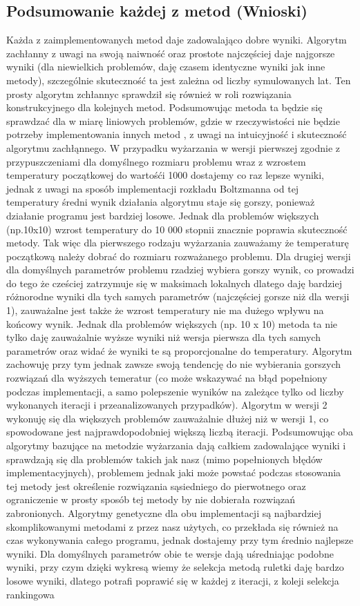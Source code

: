 \documentclass{article}
\begin{document}
\subsection{Podsumowanie każdej z metod (Wnioski)}
Każda z zaimplementowanych metod daje zadowalająco dobre wyniki. Algorytm zachłanny z uwagi na swoją naiwność oraz prostote najczęściej daje najgorsze wyniki (dla niewielkich problemów, daję czasem identyczne wyniki jak inne metody), szczególnie skuteczność ta jest zależna od liczby symulowanych lat. Ten prosty algorytm zchłannyc sprawdził się również w roli rozwiązania konstrukcyjnego dla kolejnych metod. Podsumowując metoda ta będzie się sprawdzać dla w miarę liniowych problemów, gdzie w rzeczywistości nie będzie potrzeby implementowania innych metod , z uwagi na intuicyjność i skuteczność algorytmu zachłąnnego. W przypadku wyżarzania w wersji pierwszej zgodnie z przypuszczeniami dla domyślnego rozmiaru problemu wraz z wzrostem temperatury początkowej do wartośći 1000 dostajemy co raz lepsze wyniki, jednak z uwagi na sposób implementacji rozkładu Boltzmanna od tej temperatury średni wynik działania algorytmu staje się gorszy, ponieważ działanie programu jest bardziej losowe. Jednak dla problemów większych (np.10x10) wzrost temperatury do 10 000 stopnii znacznie poprawia skuteczność metody. Tak więc dla pierwszego rodzaju wyżarzania zauważamy że temperaturę początkową należy dobrać do rozmiaru rozważanego problemu.  Dla drugiej wersji dla domyślnych parametrów problemu rzadziej wybiera gorszy wynik, co prowadzi do tego że cześciej zatrzymuje się w maksimach lokalnych dlatego daję bardziej różnorodne wyniki dla tych samych parametrów (najczęściej gorsze niż dla wersji 1), zauważalne jest także że wzrost temperatury nie ma dużego wpływu na końcowy wynik. Jednak dla problemów większych (np. 10 x 10) metoda ta nie tylko daję zauważalnie wyższe wyniki niż wersja pierwsza dla tych samych parametrów oraz widać że wyniki te są proporcjonalne do temperatury. Algorytm zachowuję przy tym jednak zawsze swoją tendencję do nie wybierania gorszych rozwiązań dla wyższych temeratur (co może wskazywać na błąd popełniony podczas implementacji, a samo polepszenie wyników na zależące tylko od liczby wykonanych iteracji i przeanalizowanych przypadków). Algorytm w wersji 2 wykonuję się dla większych problemów zauważalnie dłużej niż w wersji 1, co spowodowane jest najprawdopodobniej większą liczbą iteracji. Podsumowując oba algorytmy bazujące na metodzie wyżarzania dają całkiem zadowalające wyniki i sprawdzają się dla problemów takich jak nasz (mimo popełnionych błędów implementacyjnych), problemem jednak jaki może powstać podczas stosowania tej metody jest określenie rozwiązania sąsiedniego do pierwotnego oraz ograniczenie w prosty sposób tej metody by nie dobierała rozwiązań zabronionych. Algorytmy genetyczne dla obu implementacji są najbardziej skomplikowanymi metodami z przez nasz użytych, co przekłada się również na czas wykonywania całego programu, jednak dostajemy przy tym średnio najlepsze wyniki.  Dla domyślnych parametrów obie te wersje dają uśredniając podobne wyniki, przy czym dzięki wykresą wiemy że selekcja metodą ruletki daję bardzo losowe wyniki, dlatego potrafi poprawić się w każdej z iteracji, z koleji selekcja rankingowa 
\end{document}
